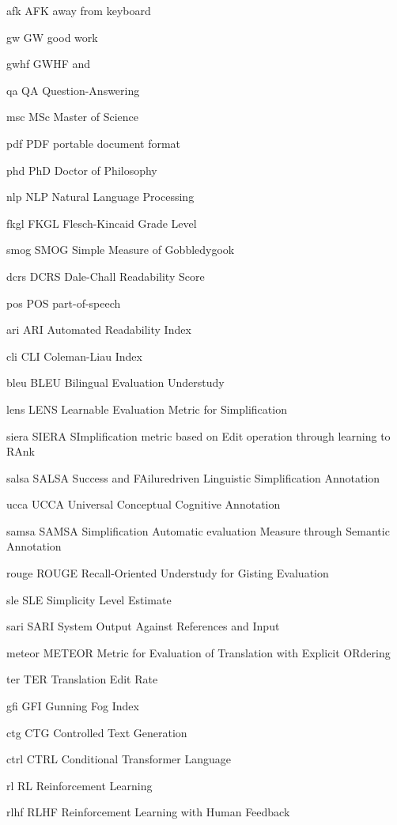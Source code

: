 \newabbreviation
{afk}
{AFK}
{away from keyboard}

\newabbreviation
{gw}
{GW}
{good work}

\newabbreviation
{gwhf}
{GWHF}
{ and }

\newabbreviation
{qa}
{QA}
{Question-Answering}

\newabbreviation
{msc}
{MSc}
{Master of Science}

\newabbreviation
{pdf}
{PDF}
{portable document format}

\newabbreviation
{phd}
{PhD}
{Doctor of Philosophy}

\newabbreviation
{nlp}
{NLP}
{Natural Language Processing}

\newabbreviation
{fkgl}
{FKGL}
{Flesch-Kincaid Grade Level}

\newabbreviation
{smog}
{SMOG}
{Simple Measure of Gobbledygook}

\newabbreviation
{dcrs}
{DCRS}
{Dale-Chall Readability Score}

\newabbreviation
{pos}
{POS}
{part-of-speech}

\newabbreviation
{ari}
{ARI}
{Automated Readability Index}

\newabbreviation
{cli}
{CLI}
{Coleman-Liau Index}

\newabbreviation
{bleu}
{BLEU}
{Bilingual Evaluation Understudy}

\newabbreviation
{lens}
{LENS}
{Learnable Evaluation Metric for Simplification}

\newabbreviation
{siera}
{SIERA}
{SImplification metric based on Edit operation through learning to RAnk}

\newabbreviation
{salsa}
{SALSA}
{Success and FAiluredriven Linguistic Simplification Annotation}

\newabbreviation
{ucca}
{UCCA}
{Universal Conceptual Cognitive Annotation}

\newabbreviation
{samsa}
{SAMSA}
{Simplification Automatic evaluation Measure through Semantic Annotation}

\newabbreviation
{rouge}
{ROUGE}
{Recall-Oriented Understudy for Gisting Evaluation}

\newabbreviation
{sle}
{SLE}
{Simplicity Level Estimate}

\newabbreviation
{sari}
{SARI}
{System Output Against References and Input}

\newabbreviation
{meteor}
{METEOR}
{Metric for Evaluation of Translation with Explicit ORdering}

\newabbreviation
{ter}
{TER}
{Translation Edit Rate}

\newabbreviation
{gfi}
{GFI}
{Gunning Fog Index}

\newabbreviation
{ctg}
{CTG}
{Controlled Text Generation}

\newabbreviation
{ctrl}
{CTRL}
{Conditional Transformer Language}

\newabbreviation
{rl}
{RL}
{Reinforcement Learning}

\newabbreviation
{rlhf}
{RLHF}
{Reinforcement Learning with Human Feedback}